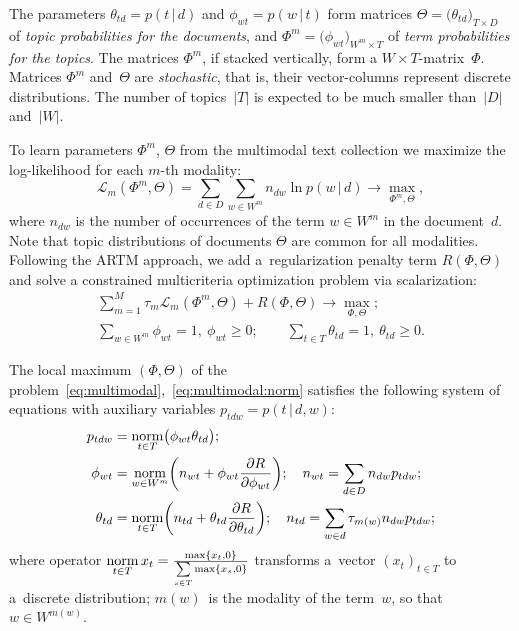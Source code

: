 \documentclass[russian,english]{llncs}
\newcommand{\norm}{\mathop{\rm norm}\limits}
\newcommand{\cond}{\mspace{3mu}{|}\mspace{3mu}}
\newcommand{\cL}{\mathscr{L}}
\begin{document}
The parameters
${\theta_{td}=p(t\cond d)}$ and ${\phi_{wt}=p(w\cond t)}$
form matrices
${\Theta = \bigl( \theta_{td} \bigr)_{T\times D}}$ of \emph{topic probabilities for the documents}, and
${\Phi^m = \bigl( \phi_{wt} \bigr)_{W^m\times T}}$ of \emph{term probabilities for the topics}.
The matrices $\Phi^m$, if stacked vertically, form a ${W\!\!\times\!T}$-matrix~$\Phi$.
Matrices $\Phi^m$ and~$\Theta$ are \emph{stochastic},
that is, their vector-columns represent discrete distributions.
The number of topics~$|T|$ is expected to be much smaller than~$|D|$ and~$|W|$.

To learn parameters $\Phi^m$, $\Theta$ from the multimodal text collection
we maximize the log-likelihood for each $m$-th modality:
\[
    \cL_m (\Phi^m,\Theta) =
    \sum_{d\in D}\sum_{w\in W^m} n_{dw} \ln p(w\cond d)
    \to \max_{\Phi^m,\Theta},
\]
where
$n_{dw}$ is the number of occurrences of the term $w\in W^m$ in the document~$d$.
Note that topic distributions of documents $\Theta$ are common for all modalities.
Following the ARTM approach,
we add a~regularization penalty term $R(\Phi,\Theta)$
and solve a constrained multicriteria optimization problem via scalarization:
\begin{gather}
\label{eq:multimodal}
    \sum_{m=1}^M \tau_m \cL_m (\Phi^m,\Theta)
    + R(\Phi,\Theta)
    \to \max_{\Phi,\Theta};
\\\label{eq:multimodal:norm}
    \sum_{w\in W^m}\!\!\! \phi_{wt} = 1,~
    \phi_{wt}\geq 0;
    \qquad
    \sum_{t\in T} \theta_{td} = 1,~
    \theta_{td}\geq 0.
\end{gather}

The local maximum $(\Phi,\Theta)$
of the problem~\eqref{eq:multimodal},~\eqref{eq:multimodal:norm}
satisfies the following system of equations
with auxiliary variables $p_{tdw} = p(t\cond d,w)$:
\begin{align}
    \label{eq:Estep}
    p_{tdw} &= \norm_{t\in T} \bigl(\phi_{wt}\theta_{td}\bigr);
\\
    \label{eq:Mstep:phi}
    \phi_{wt} &= \norm_{w\in W^m}
        \biggl(
            n_{wt} + \phi_{wt} \frac{\partial R}{\partial \phi_{wt}}
        \biggr);
    \quad
    n_{wt} = \sum_{d\in D} n_{dw} p_{tdw};
\\
    \label{eq:Mstep:theta}
    \theta_{td} &= \norm_{t\in T}
        \biggl(
            n_{td} + \theta_{td} \frac{\partial R}{\partial \theta_{td}}
        \biggr);
    \quad
    n_{td} =
        \sum_{w\in d} \tau_{m(w)} n_{dw} p_{tdw};
\end{align}
where operator
$\norm_{t\in T} x_t = \frac{\max\{x_t,0\}}{\sum\limits_{s\in T} \max\{x_s,0\}}$
transforms a~vector $(x_t)_{t\in T}$ to a~discrete distribution;
$m(w)$~is the modality of the term~$w$, so that $w\in W^{m(w)}$.
\end{document}
